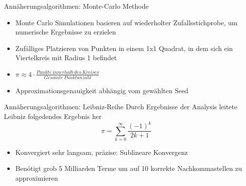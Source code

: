\documentclass{beamer}
\begin{document}
\begin{frame}{Annäherungsalgorithmen: Monte-Carlo Methode}                                                                                                  %
    \begin{itemize}
        \item<1-> Monte Carlo Simulationen basieren auf wiederholter Zufallsstichprobe, um numerische Ergebnisse zu erzielen
        \item<2-> Zufälliges Platzieren von Punkten in einem 1x1 Quadrat, in dem sich ein Viertelkreis mit Radius 1 befindet
        \item<3-> \( \pi \approx 4 \cdot \frac{Punkte \: innerhalb \: des \: Kreises}{Gesamte \: Punktanzahl} \)
        \item<4-> Approximationsgenauigkeit abhängig vom gewählten Seed
    \end{itemize}
\end{frame}


\begin{frame}{Annäherungsalgorithmen: Leibniz-Reihe}
    Durch Ergebnisse der Analysis leitete Leibniz folgedendes Ergebnis her \cite{Leibniz}                                                                                                       
    \[ \pi = \sum_{k=0}^{\infty} \frac{(-1)^k}{2k+1} \] 
    \begin{itemize}
        \item<3-> Konvergiert sehr langsam, präzise: Sublineare Konvergenz \\
        \item<3-> Benötigt grob 5 Milliarden Terme um auf 10 korrekte Nachkommastellen zu approximieren
    \end{itemize}
\end{frame}
\end{document}
